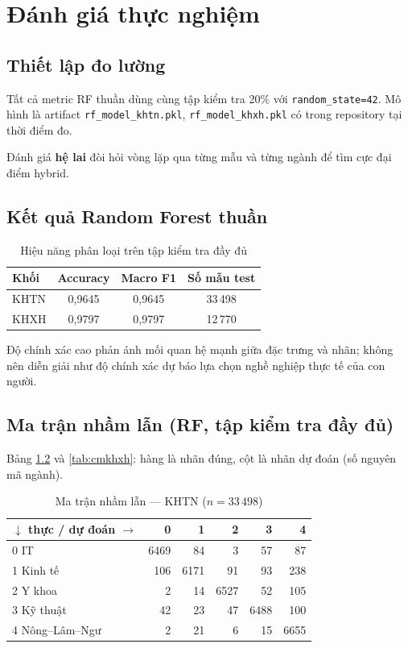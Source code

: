 \chapter{Đánh giá thực nghiệm}

\section{Thiết lập đo lường}
Tất cả metric RF thuần dùng cùng tập kiểm tra 20\% với \texttt{random\_state=42}. Mô hình là artifact \texttt{rf\_model\_khtn.pkl}, \texttt{rf\_model\_khxh.pkl} có trong repository tại thời điểm đo.

Đánh giá \textbf{hệ lai} đòi hỏi vòng lặp qua từng mẫu và từng ngành để tìm cực đại điểm hybrid.

\section{Kết quả Random Forest thuần}
\begin{table}[htbp]
\centering
\caption{Hiệu năng phân loại trên tập kiểm tra đầy đủ}
\label{tab:mlmetrics}
\begin{tabular}{lccc}
\toprule
Khối & Accuracy & Macro F1 & Số mẫu test \\
\midrule
KHTN & 0{,}9645 & 0{,}9645 & 33\,498 \\
KHXH & 0{,}9797 & 0{,}9797 & 12\,770 \\
\bottomrule
\end{tabular}
\end{table}

Độ chính xác cao phản ánh mối quan hệ mạnh giữa đặc trưng và nhãn; không nên diễn giải như độ chính xác dự báo lựa chọn nghề nghiệp thực tế của con người.

\section{Ma trận nhầm lẫn (RF, tập kiểm tra đầy đủ)}
Bảng \ref{tab:cmkhtn} và \ref{tab:cmkhxh}: hàng là nhãn đúng, cột là nhãn dự đoán (số nguyên mã ngành).

\begin{table}[htbp]
\centering
\caption{Ma trận nhầm lẫn --- KHTN ($n=33\,498$)}
\label{tab:cmkhtn}
\small
\begin{tabular}{lrrrrr}
\toprule
$\downarrow$ thực / dự đoán $\rightarrow$ & 0 & 1 & 2 & 3 & 4 \\
\midrule
0 IT & 6469 & 84 & 3 & 57 & 87 \\
1 Kinh tế & 106 & 6171 & 91 & 93 & 238 \\
2 Y khoa & 2 & 14 & 6527 & 52 & 105 \\
3 Kỹ thuật & 42 & 23 & 47 & 6488 & 100 \\
4 Nông--Lâm--Ngư & 2 & 21 & 6 & 15 & 6655 \\
\bottomrule
\end{tabular}
\end{table}

